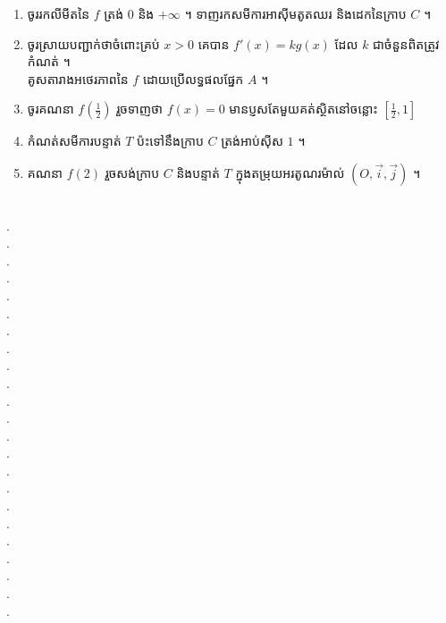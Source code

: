 \documentclass{officialexam}
\begin{document}
\begin{enumerate}[I]
\begin{enumerate}[k]
			\item ចូររកលីមីតនៃ $f$ ត្រង់ $0$ និង $+\infty$ ។ ទាញរកសមីការអាស៊ីមតូតឈរ និងដេកនៃក្រាប $C$ ។
			\item ចូរស្រាយបញ្ជាក់ថាចំពោះគ្រប់ $x>0$ គេបាន $f'(x)=kg(x)$ ដែល $k$ ជាចំនួនពិតត្រូវកំណត់ ។​\\ គូសតារាងអថេរភាពនៃ $f$ ដោយប្រើលទ្ធផលផ្នែក $A$ ។
			\item ចូរគណនា $f\left(\frac{1}{2}\right)$ រួចទាញថា $f(x)=0$ មានប្ញសតែមួយគត់ស្ថិតនៅចន្លោះ $\left[\frac{1}{2},1\right]$
			\item កំណត់សមីការបន្ទាត់ $T$ ប៉ះទៅនឹងក្រាប $C$ ត្រង់អាប់ស៊ីស $1$ ។
			\item គណនា $f(2)$ រួចសង់ក្រាប $C$ និងបន្ទាត់ $T$ ក្នុងតម្រុយអរតូណរម៉ាល់ $(O,\vec{i}, \vec{j})$ ។
		\end{enumerate}
	\end{enumerate}
\\
{\color{white}.}\dotfill\\
{\color{white}.}\dotfill\\
{\color{white}.}\dotfill
\\
{\color{white}.}\dotfill\\
{\color{white}.}\dotfill\\
{\color{white}.}\dotfill
\\
{\color{white}.}\dotfill\\
{\color{white}.}\dotfill\\
{\color{white}.}\dotfill
\\
{\color{white}.}\dotfill\\
{\color{white}.}\dotfill\\
{\color{white}.}\dotfill
\\
{\color{white}.}\dotfill\\
{\color{white}.}\dotfill\\
{\color{white}.}\dotfill
\\
{\color{white}.}\dotfill\\
{\color{white}.}\dotfill\\
{\color{white}.}\dotfill
\\
{\color{white}.}\dotfill\\
{\color{white}.}\dotfill\\
{\color{white}.}\dotfill
\\
{\color{white}.}\dotfill\\
{\color{white}.}\dotfill
\newpage
{\maketitle}
\end{document}
